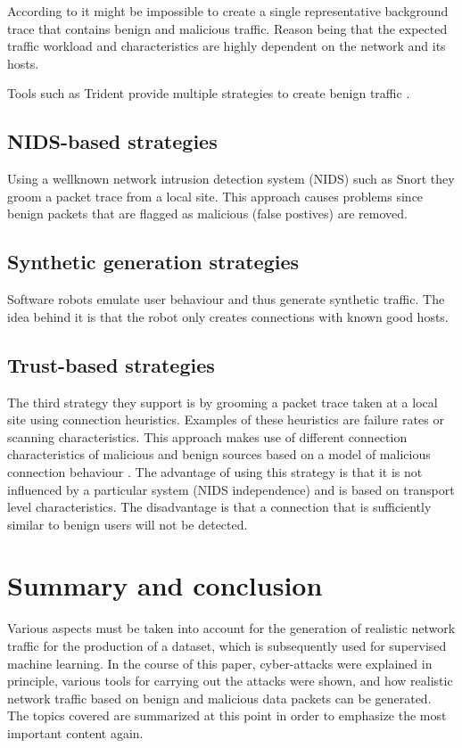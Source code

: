 \documentclass[conference]{IEEEtran}
\begin{document}
\smallskip According to \cite{b10} it might be impossible to create a single representative background trace that contains benign and malicious traffic. Reason being that the expected traffic workload and characteristics are highly dependent on the network and its hosts.

Tools such as Trident provide multiple strategies to create benign traffic \cite{b10}. 

\subsection{NIDS-based strategies}
Using a wellknown network intrusion detection system (NIDS) such as Snort they groom a packet trace from a local site. This approach causes problems since benign packets that are flagged as malicious (false postives) are removed.

\subsection{Synthetic generation strategies}
Software robots emulate user behaviour and thus generate synthetic traffic. The idea behind it is that the robot only creates connections with known good hosts. 

\subsection{Trust-based strategies}
The third strategy they support is by grooming a packet trace taken at a local site using connection heuristics. Examples of these heuristics are failure rates or scanning characteristics. This approach makes use of different connection characteristics of malicious and benign sources based on a model of malicious connection behaviour \cite{b10}.
The advantage of using this strategy is that it is not influenced by a particular system (NIDS independence) and is based on transport level characteristics. The disadvantage is that a connection that is sufficiently similar to benign users will not be detected.



\section{Summary and conclusion}
Various aspects must be taken into account for the generation of realistic network traffic for the production of a dataset, which is subsequently used for supervised machine learning. In the course of this paper, cyber-attacks were explained in principle, various tools for carrying out the attacks were shown, and how realistic network traffic based on benign and malicious data packets can be generated. The topics covered are summarized at this point in order to emphasize the most important content again.
\end{document}
